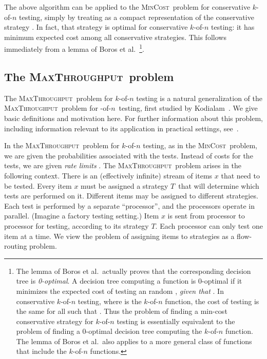 \documentclass{article}
\newcounter{ass}
\newcommand{\ens}[1]{\ensuremath{#1}}					\newcommand{\card}[1]{\ens{|#1|}}							\newcommand{\dotlist}[2]{\ens{#1,\ldots,#2}}
\newcommand{\anitem}{\ens{x}}
\newcommand{\valn}{\ens{n}}
\newcommand{\valk}{\ens{k}}
\newcommand{\maxthru}{\textsc{MaxThroughput}}
\newcommand{\mincost}{\textsc{MinCost}}
\newcommand{\kofn}{\valk-of-\valn}
\newcommand{\oneofn}{-of-\valn}
\newcommand{\strategy}{\ens{T}}
\newcommand{\processor}{processor}
\begin{document}
The above algorithm can be applied to the \mincost\ problem
for conservative \kofn{} testing, simply by treating  as
a compact representation of the conservative strategy \cstrat{\valk}{\perm}.
In fact, that strategy is optimal for conservative \kofn{} testing: it has
minimum expected cost among
all conservative strategies.   This follows immediately from a lemma of Boros et al.~\cite{journals/amai/BorosU99}\footnote{The lemma of Boros et al.~actually 
proves that the corresponding decision tree is {\em 0-optimal}.
A decision tree computing a function  
is 0-optimal if it minimizes the expected cost of
testing an random , {\em given that }.
In conservative \kofn{} testing, where  is the
\kofn{} function, the cost of testing  is the same for all  such that .
Thus the problem of finding a min-cost conservative strategy for \kofn{} testing
is essentially equivalent to the problem of finding a 0-optimal decision tree
computing the \kofn{} function.  The lemma of Boros et al.~also applies to a more
general class of functions  that include the \kofn{} functions.
}. 



\subsection{The \maxthru\ problem}

The \maxthru\ problem for \kofn{} testing
is a natural generalization of the 
\maxthru\ problem for
\oneofn\ testing,
first studied by Kodialam~\cite{conf/ipco/Kodialam01}. 
We give basic definitions and motivation here.
For further information about this problem, including
information relevant to its application in practical settings, 
see~\cite{conf/ipco/Kodialam01,conf/pods/CondonDHW06,journals/talg/CondonDHW09}.

In the \maxthru\ problem for \kofn{} testing, as in the \mincost\ problem, 
we are given the probabilities
 associated with the tests.
Instead of costs  for the tests, we are given
{\em rate limits} .
The \maxthru\ problem arises in the following context.
There is an (effectively infinite) stream of items \anitem{} that need to be tested.
Every item \anitem{} must be assigned a strategy \strategy\ that will
determine which tests are performed on it.
Different items may be assigned to different strategies.
Each test is performed by a separate ``{\processor}'', and the {\processor}s operate in parallel.
(Imagine a factory testing setting.)
Item \anitem{} is sent from {\processor} to {\processor} for testing, 
according to its strategy \strategy.
Each {\processor} can only test one item at a time.
We view the problem of assigning items to strategies as
a flow-routing problem.
\end{document}
